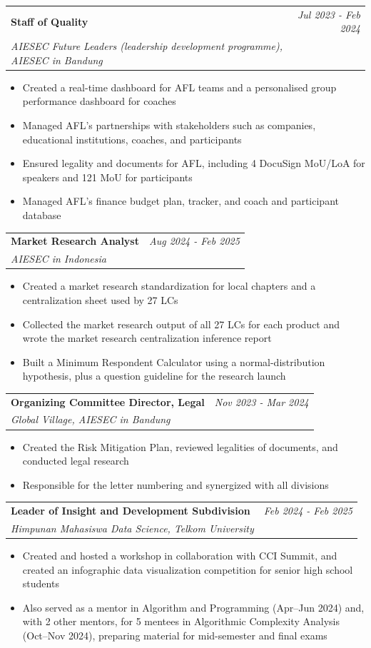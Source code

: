 \documentclass[a4paper,11pt]{article}
\makeatletter
\newcommand{\resumeSubheading}[4]{
\vspace{0.5mm}\item
    \begin{tabular*}{0.98\textwidth}[t]{l@{\extracolsep{\fill}}r}
        \textbf{#1} & \textit{\footnotesize{#4}} \\
        \textit{\footnotesize{#3}} &  \footnotesize{#2}\\
    \end{tabular*}
    \vspace{-2.4mm}
}
\newcommand{\resumeItemListStart}{\begin{justify}\begin{itemize}[leftmargin=3ex, rightmargin=2ex, noitemsep,labelsep=1.2mm,itemsep=0mm]\small}
\newcommand{\resumeItemListEnd}{\end{itemize}\end{justify}\vspace{-2mm}}
\makeatother
\begin{document}
    \resumeSubheading
      {Staff of Quality}{}
      {AIESEC Future Leaders (leadership development programme), AIESEC in Bandung}{Jul 2023 - Feb 2024}
      \vspace{-2.0mm}
      \resumeItemListStart
        \item {Created a real-time dashboard for AFL teams and a personalised group performance dashboard for coaches}
        \item {Managed AFL's partnerships with stakeholders such as companies, educational institutions, coaches, and participants}
        \item {Ensured legality and documents for AFL, including 4 DocuSign MoU/LoA for speakers and 121 MoU for participants}
        \item {Managed AFL's finance budget plan, tracker, and coach and participant database}
      \resumeItemListEnd
      \vspace{-3.0mm}

    \resumeSubheading
      {Market Research Analyst}{}
      {AIESEC in Indonesia}{Aug 2024 - Feb 2025}
      \vspace{-2.0mm}
      \resumeItemListStart
        \item {Created a market research standardization for local chapters and a centralization sheet used by 27 LCs}
        \item {Collected the market research output of all 27 LCs for each product and wrote the market research centralization inference report}
        \item {Built a Minimum Respondent Calculator using a normal-distribution hypothesis, plus a question guideline for the research launch}
      \resumeItemListEnd
      \vspace{-3.0mm}

    \resumeSubheading
      {Organizing Committee Director, Legal}{}
      {Global Village, AIESEC in Bandung}{Nov 2023 - Mar 2024}
      \vspace{-2.0mm}
      \resumeItemListStart
        \item {Created the Risk Mitigation Plan, reviewed legalities of documents, and conducted legal research}
        \item {Responsible for the letter numbering and synergized with all divisions}
      \resumeItemListEnd
      \vspace{-3.0mm}

    \resumeSubheading
      {Leader of Insight and Development Subdivision}{}
      {Himpunan Mahasiswa Data Science, Telkom University}{Feb 2024 - Feb 2025}
      \vspace{-2.0mm}
      \resumeItemListStart
        \item {Created and hosted a workshop in collaboration with CCI Summit, and created an infographic data visualization competition for senior high school students}
        \item {Also served as a mentor in Algorithm and Programming (Apr--Jun 2024) and, with 2 other mentors, for 5 mentees in Algorithmic Complexity Analysis (Oct--Nov 2024), preparing material for mid-semester and final exams}
      \resumeItemListEnd
      \vspace{-3.0mm}
\end{document}
